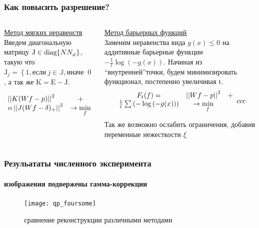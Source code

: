 \begingroup
\small
\begin{frame}
  \frametitle{Как повысить разрешение?}
  \begin{columns}[T, onlytextwidth]
  \hspace{-0.5cm}
  \begin{column}{0.5\textwidth}
    \underline{Метод мягких неравенств} \\ \vspace{0.5cm}
    Введем диагональную матрицу $\mathrm J \in \textup{diag}\{N N_\varphi\}$, такую что 
    $\mathrm J_{j} = \left\{1, \mbox{если}\ j \in \mathbb J, \mbox{иначе }\ 0\right\}$, а так же $\mathrm K = \mathrm E - \mathrm J$.


    \begin{equation} \notag
      \label{eq:soft-ineq}
      \begin{array}{lc}
      \left|\left| K(Wf - p) \right|\right|^2 & + \\
      \alpha \left|\left| J(Wf - \delta)_{+} \right|\right|^2  & \to \min\limits_f
      \end{array}
    \end{equation}
  \end{column}

  \begin{column}{0.5\textwidth}
    \underline{Метод барьерных функций} \\ \vspace{0.5cm}
    Заменим неравенства вида $g(x) \leq 0$ на аддитивные барьерные функции $-\frac 1 t \log{\left(-g(x)\right)}$.
    Начиная из ``внутренней''точки, будем минимизировать функционал, постепенно увеличивая t.
    $$
    \begin{array}{ccc}
      F_t(f) = & \left|\left| Wf - p \right|\right|^2 & + \\
     \frac 1 t \sum \left( -\log{\left(-g(x)\right)} \right) &\to \min\limits_f &
    \end{array}{ccc}
    $$

    Так же возможно ослабить ограничения, добавив переменные нежесткости $\xi$

  \end{column}
  \end{columns}
\end{frame}
\endgroup

\begin{frame}
\frametitle{Резульататы численного эксперимента}
\framesubtitle{изображения подвержены гамма-коррекции}

\begin{figure}
  \centering
  \vspace{-0.3cm}
  \texttt{[image: qp\_foursome]}
  \caption{сравнение реконструкции различными методами}
  \label{fig:sample}
\end{figure}

\end{frame}

